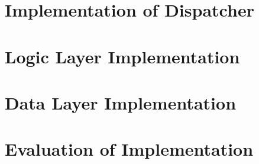 \section{Implementation of Dispatcher}



\section{Logic Layer Implementation}





\section{Data Layer Implementation}

\section{Evaluation of Implementation}